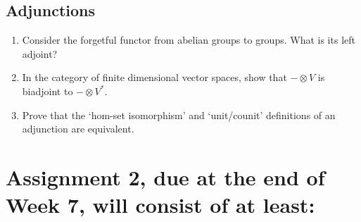 \documentclass[12pt]{amsart}
\begin{document}
\subsection{Adjunctions}
\begin{enumerate}
\item Consider the forgetful functor from abelian groups to groups. What is its left adjoint?
\item In the category of finite dimensional vector spaces, show that $- \otimes V$ is biadjoint to $- \otimes V^*$.
\item Prove that the `hom-set isomorphism' and `unit/counit' definitions of an adjunction are equivalent.
\end{enumerate}


\section{Assignment 2, due at the end of Week 7, will consist of at least:}
\end{document}
